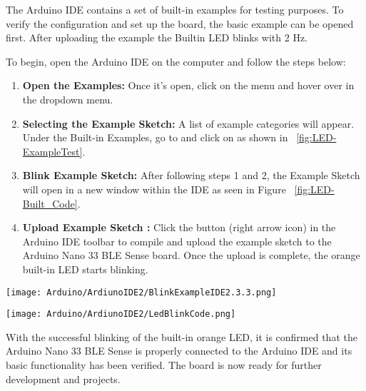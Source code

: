 The Arduino IDE contains a set of built-in examples for testing purposes. To verify the configuration and set up the board, the basic example  can be opened first. After uploading the example  the Builtin LED blinks with 2 Hz. 


To begin, open the Arduino IDE on the computer and follow the steps below:

\begin{enumerate}



\item \textbf{Open the Examples:} Once it's open, click on the  menu and hover over  in the dropdown menu. 

\item \textbf{Selecting the Example Sketch:} A list of example categories will appear. Under the Built-in Examples, go to  and click on  as shown in ~\ref{fig:LED-ExampleTest}.

\item \textbf{Blink Example Sketch:} After following steps 1 and 2, the  Example Sketch  will open in a new window within the IDE as seen in Figure ~\ref{fig:LED-Built_Code}.

\item \textbf{Upload Example Sketch :} Click the  button (right arrow icon) in the Arduino IDE toolbar to compile and upload the example sketch to the Arduino Nano 33 BLE Sense board. Once the upload is complete, the orange built-in LED starts blinking. 



\end{enumerate}


\begin{center}
	\texttt{[image: Arduino/ArdiunoIDE2/BlinkExampleIDE2.3.3.png]}
	\label{fig:LED-ExampleTest}		
\end{center} 



\begin{center}
	\texttt{[image: Arduino/ArdiunoIDE2/LedBlinkCode.png]}
	\label{fig:LED-Built_Code}		
\end{center} 



With the successful blinking of the built-in orange LED, it is confirmed that the Arduino Nano 33 BLE Sense is properly connected to the Arduino IDE and its basic functionality has been verified. The board is now ready for further development and projects.






